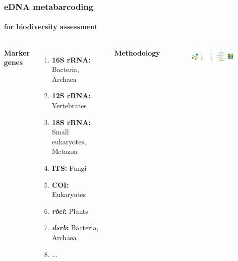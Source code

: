 \documentclass{beamer}
\begin{document}
   \begin{darkframes}

   \begin{frame}
      
      \frametitle{eDNA metabarcoding}
      \framesubtitle{for biodiversity assessment}
      \begin{singlespace}


         \begin{columns}[onlytextwidth]


               \textbf{Marker genes} \\ 

               \begin{enumerate}
                  \item \textbf{16S rRNA:} Bacteria, Archaea
                  \item \textbf{12S rRNA:} Vertebrates
                  \item \textbf{18S rRNA:} Small eukaryotes, Metazoa
                  \item \textbf{ITS:} Fungi
                  \item \textbf{COI:} Eukaryotes
                  \item \textbf{\textit{rbcl}:} Plants
                  \item \textbf{\textit{dsrb}:} Bacteria, Archaea
                  \item ...
               \end{enumerate}


               \textbf{Methodology}

               \begin{figure}
                  \includegraphics[width=55mm]{resources/metabarcoding-steps.png}
               \end{figure}


\end{columns}
\end{singlespace}
\end{frame}
\end{darkframes}
\end{document}
